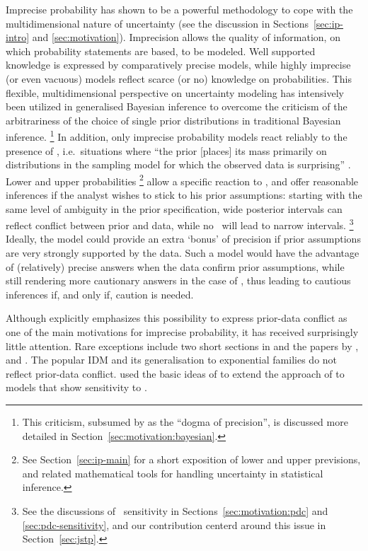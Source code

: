 Imprecise probability has shown to be a
powerful methodology to cope with the multidimensional nature of
uncertainty (see the discussion in Sections~\ref{sec:ip-intro} and \ref{sec:motivation}).
Imprecision allows the quality of information, on which probability statements are
based, to be modeled. Well supported knowledge is expressed by comparatively
precise models, while highly imprecise (or even vacuous) models reflect scarce (or no) knowledge
on probabilities. This flexible, multidimensional perspective on uncertainty
modeling has intensively been utilized in generalised Bayesian
inference to overcome the criticism of the arbitrariness of
the choice of single prior distributions in traditional Bayesian inference.%
\footnote{%
This criticism, subsumed by \textcite[\S 5]{1991:walley} as the ``dogma of precision'',
is discussed more detailed in Section~\ref{sec:motivation:bayesian}.}
In addition, only imprecise probability models react reliably to the presence of
\pdc, i.e.\ situations  where ``the prior [places] its mass primarily on
distributions in the sampling model for which the observed data is
surprising'' \parencite[p.~894]{2006:evans}. Lower and upper probabilities%
\footnote{See Section~\ref{sec:ip-main} for a short exposition of lower and upper previsions,
and related mathematical tools for handling uncertainty in statistical inference.}
allow a specific reaction to \pdc, and offer reasonable inferences if the analyst wishes to
stick to his prior assumptions: starting with the same level of ambiguity in the prior
specification, wide posterior intervals can
reflect conflict between prior and data, while
no \pdc\ will lead to narrow intervals.%
\footnote{See the discussions of \pdc\ sensitivity in Sections~\ref{sec:motivation:pdc} and \ref{sec:pdc-sensitivity},
and our contribution centerd around this issue in Section~\ref{sec:jstp}.}
Ideally, the model could provide an extra `bonus' of precision if prior %
assumptions are very strongly supported by the data.
Such a model would have the advantage
of (relatively) precise answers when the data confirm prior assumptions,
while still rendering more cautionary answers in the case of \pdc,
thus leading to cautious inferences if, and only if, caution is needed.

Although \textcite[p.~6]{1991:walley} explicitly emphasizes this possibility to
express prior-data conflict as one of the main motivations for imprecise probability,
it has received surprisingly little attention. Rare exceptions include two short sections in \textcite[p.~6 and \S 5.4]{1991:walley}
and the papers by \textcite{1991:pericchi}, \textcite{1994:coolen} and
\textcite{2005:whitcomb}. The popular IDM \parencite{1996:walley::idm, 2009:bernard}
and its generalisation to exponential families \parencite{2005:quaeghebeurcooman} do not reflect prior-data conflict.
\textcite[see Section~\ref{sec:jstp}]{Walter2009a} used the basic ideas of \textcite[\S 5.4]{1991:walley} to extend the approach of
\textcite{2005:quaeghebeurcooman} to models that show sensitivity to \pdc.

